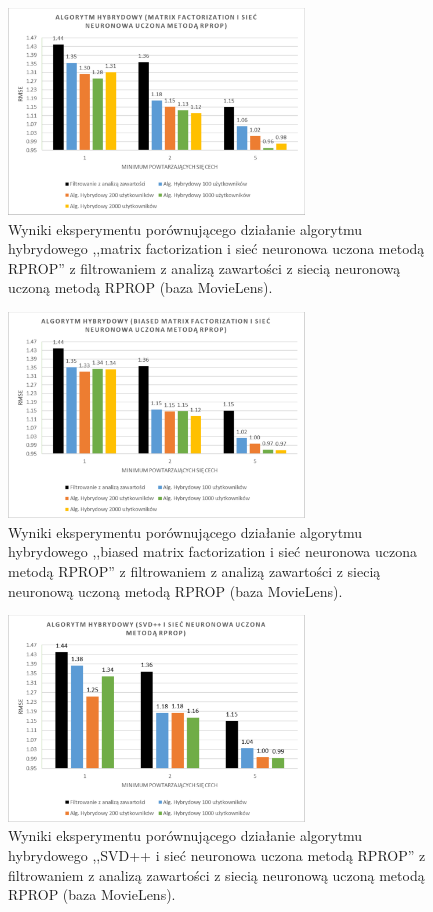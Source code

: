 \documentclass[twoside]{iisthesis}
\begin{document}
		\begin{figure}
			\centering
			\includegraphics[width=0.7\textwidth]{ml_exphybrid1_4}			
			\caption{Wyniki eksperymentu porównującego działanie algorytmu hybrydowego ,,matrix factorization i sieć neuronowa uczona metodą RPROP'' z filtrowaniem z analizą zawartości z siecią neuronową uczoną metodą RPROP (baza MovieLens).}
			\label{fig:ml_exphybrid1_4}
		\end{figure}
	
		\begin{figure}
			\centering
			\includegraphics[width=0.7\textwidth]{ml_exphybrid1_5}			
			\caption{Wyniki eksperymentu porównującego działanie algorytmu hybrydowego ,,biased matrix factorization i sieć neuronowa uczona metodą RPROP'' z filtrowaniem z analizą zawartości z siecią neuronową uczoną metodą RPROP (baza MovieLens).}
			\label{fig:ml_exphybrid1_5}
		\end{figure}
		
		\begin{figure}
			\centering
			\includegraphics[width=0.7\textwidth]{ml_exphybrid1_6}			
			\caption{Wyniki eksperymentu porównującego działanie algorytmu hybrydowego ,,SVD++ i sieć neuronowa uczona metodą RPROP'' z filtrowaniem z analizą zawartości z siecią neuronową uczoną metodą RPROP (baza MovieLens).}
			\label{fig:ml_exphybrid1_6}
		\end{figure}
		
\end{document}
